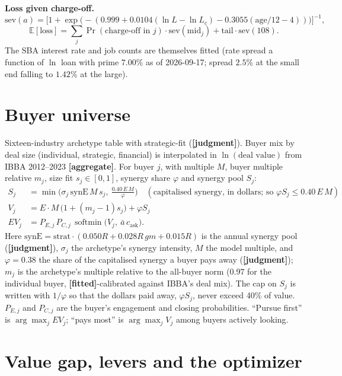 \documentclass[11pt]{article}
\DeclareMathOperator{\softmin}{softmin}
\newcommand{\EV}[1]{\mathbb{E}\!\left[#1\right]}
\newcommand{\fit}{\textbf{[fitted]}}
\newcommand{\agg}{\textbf{[aggregate]}}
\newcommand{\jud}{\textbf{[judgment]}}
\begin{document}
\textbf{Loss given charge-off.}
\begin{equation}
\text{sev}(a)=\big[1+\exp\!\big(-(0.999+0.0104(\ln L-\ln L_c)-0.3055(\text{age}/12-4))\big)\big]^{-1},
\end{equation}
\begin{equation}
\EV{\text{loss}}=\sum_j \Pr(\text{charge-off in }j)\cdot\text{sev}(\text{mid}_j)+\text{tail}\cdot\text{sev}(108).
\end{equation}
The SBA interest rate and job counts are themselves fitted (rate spread a function of $\ln$ loan with prime $7.00\%$ as of 2026-09-17; spread $2.5\%$ at the small end falling to $1.42\%$ at the large).

\section{Buyer universe}
Sixteen-industry archetype table with strategic-fit (\jud). Buyer mix by deal size (individual, strategic, financial) is interpolated in $\ln(\text{deal value})$ from IBBA 2012--2023 \agg. For buyer $j$, with multiple $M$, buyer multiple relative $m_j$, size fit $s_j\in[0,1]$, synergy share $\varphi$ and synergy pool $S_j$:
\begin{align}
S_j&=\min\!\Big(\sigma_j\,\text{synE}\,M\,s_j,\ \tfrac{0.40\,E\,M}{\varphi}\Big)\quad(\text{capitalised synergy, in dollars; so }\varphi S_j\le0.40\,E\,M)\\
V_j&=E\cdot M\,\big(1+(m_j-1)s_j\big)+\varphi S_j\\
EV_j&=P_{E,j}\,P_{C,j}\,\softmin\!\big(V_j,\ \bar a\,c_{\text{ask}}\big).
\end{align}
Here $\text{synE}=\text{strat}\cdot(0.050R+0.028R\,gm+0.015R)$ is the annual synergy pool (\jud), $\sigma_j$ the archetype's synergy intensity, $M$ the model multiple, and $\varphi=0.38$ the share of the capitalised synergy a buyer pays away (\jud); $m_j$ is the archetype's multiple relative to the all-buyer norm ($0.97$ for the individual buyer, \fit-calibrated against IBBA's deal mix). The cap on $S_j$ is written with $1/\varphi$ so that the dollars paid away, $\varphi S_j$, never exceed 40\% of value. $P_{E,j}$ and $P_{C,j}$ are the buyer's engagement and closing probabilities. ``Pursue first'' is $\arg\max_j EV_j$; ``pays most'' is $\arg\max_j V_j$ among buyers actively looking.

\section{Value gap, levers and the optimizer}
\end{document}
